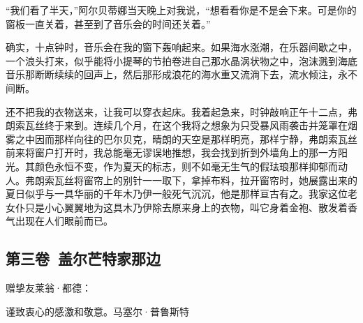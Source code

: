 \par “我们看了半天，”阿尔贝蒂娜当天晚上对我说，“想看看你是不是会下来。可是你的窗板一直关着，甚至到了音乐会的时间还关着。”
\par 确实，十点钟时，音乐会在我的窗下轰响起来。如果海水涨潮，在乐器间歇之中，一个浪头打来，似乎能将小提琴的节拍卷进自己那水晶涡状物之中，泡沫溅到海底音乐那断断续续的回声上，然后那形成浪花的海水重又流淌下去，流水倾注，永不间断。
\par 还不把我的衣物送来，让我可以穿衣起床。我着起急来，时钟敲响正午十二点，弗朗索瓦丝终于来到。连续几个月，在这个我将之想象为只受暴风雨袭击并笼罩在烟雾之中因而那样向往的巴尔贝克，晴朗的天空是那样明亮，那样宁静，弗朗索瓦丝前来将窗户打开时，我总能毫无谬误地推想，我会找到折到外墙角上的那一方阳光。其颜色永恒不变，作为夏天的标志，则不如毫无生气的假珐琅那样抑郁而动人。弗朗索瓦丝将窗帘上的别针一一取下，拿掉布料，拉开窗帘时，她展露出来的夏日似乎与一具华丽的千年木乃伊一般死气沉沉，他是那样亘古有之。我家这位老女仆只是小心翼翼地为这具木乃伊除去原来身上的衣物，叫它身着金袍、散发着香气出现在人们眼前而已。




\subsection{第三卷\ 盖尔芒特家那边}


\begin{center}
\par 赠挚友莱翁·都德：
\par 谨致衷心的感激和敬意。马塞尔·普鲁斯特
\end{center}






















